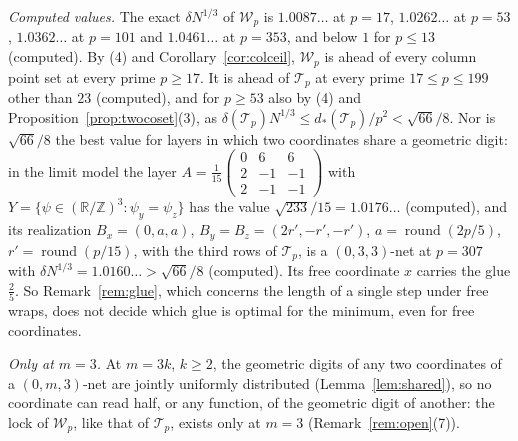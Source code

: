 \documentclass[11pt]{amsart}
\theoremstyle{definition}
\theoremstyle{plain}
\newcommand{\Z}{\mathbb{Z}}
\providecommand{\R}{\mathbb{R}}
\begin{document}
\emph{Computed values.} The exact $\delta N^{1/3}$ of $\mathcal W_p$ is $1.0087\ldots$ at $p=17$, $1.0262\ldots$ at $p=53$, $1.0362\ldots$ at $p=101$ and $1.0461\ldots$ at $p=353$, and below $1$ for $p\le13$ (computed). By (4) and Corollary~\ref{cor:colceil}, $\mathcal W_p$ is ahead of every column point set at every prime $p\ge17$. It is ahead of $\mathcal T_p$ at every prime $17\le p\le199$ other than $23$ (computed), and for $p\ge53$ also by (4) and Proposition~\ref{prop:twocoset}(3), as $\delta(\mathcal T_p)N^{1/3}\le d_*(\mathcal T_p)/p^2<\sqrt{66}/8$. Nor is $\sqrt{66}/8$ the best value for layers in which two coordinates share a geometric digit: in the limit model the layer $A=\frac1{15}\left(\begin{smallmatrix}0&6&6\\2&-1&-1\\2&-1&-1\end{smallmatrix}\right)$ with $Y=\{\psi\in(\R/\Z)^3:\psi_y=\psi_z\}$ has the value $\sqrt{233}/15=1.0176\ldots$ (computed), and its realization $B_x=(0,a,a)$, $B_y=B_z=(2r',-r',-r')$, $a=\operatorname{round}(2p/5)$, $r'=\operatorname{round}(p/15)$, with the third rows of $\mathcal T_p$, is a $(0,3,3)$-net at $p=307$ with $\delta N^{1/3}=1.0160\ldots>\sqrt{66}/8$ (computed). Its free coordinate $x$ carries the glue $\frac25$. So Remark~\ref{rem:glue}, which concerns the length of a single step under free wraps, does not decide which glue is optimal for the minimum, even for free coordinates.

\emph{Only at $m=3$.} At $m=3k$, $k\ge2$, the geometric digits of any two coordinates of a $(0,m,3)$-net are jointly uniformly distributed (Lemma~\ref{lem:shared}), so no coordinate can read half, or any function, of the geometric digit of another: the lock of $\mathcal W_p$, like that of $\mathcal T_p$, exists only at $m=3$ (Remark~\ref{rem:open}(7)).
\end{document}
